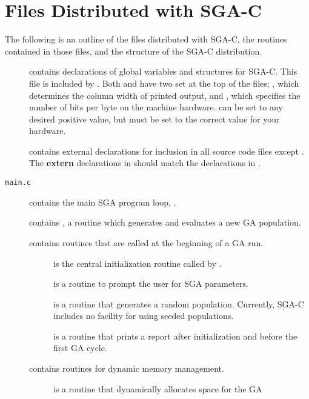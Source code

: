 \section{Files Distributed with SGA-C}
\label{files}
The following is an outline of the files distributed 
with SGA-C, the routines contained in those files, and the
{} structure of the SGA-C distribution.
\begin{description}
\item[{}] contains declarations of global variables and structures 
for SGA-C.  This file is included by {}.
Both {} and {} have two
{} set at the top of the files; {}, which determines the
column width of printed output, and {}, which specifies the number
of bits per byte on the machine hardware.  {} can be set to any
desired positive value, but {} must be set to the correct value for your
hardware.
\item[{}] contains external declarations for inclusion
in all source code files except {}.  The {\bf extern} declarations in {}
should match the declarations 
in {}.
\item[{\tt main.c}] contains the main SGA program loop, 
{}.
\item[{}] contains {}, a routine which generates and 
evaluates a new GA population.  
\item[{}] contains routines that are called at the beginning 
of a GA run.
\begin{description}
\item[{}] is the central initialization routine called by 
{}.
\item[{}] is a routine to prompt the user for SGA parameters.
\item[{}] is a routine that generates a random population. Currently, 
SGA-C includes no facility for using seeded populations.
\item[{}] is a routine that prints a report after initialization 
and before the first GA cycle.
\end{description}
\item[{}] contains routines for dynamic memory management.  
\begin{description}
\item[{}] is a routine that dynamically allocates space for the GA 

\end{description}
\end{description}
